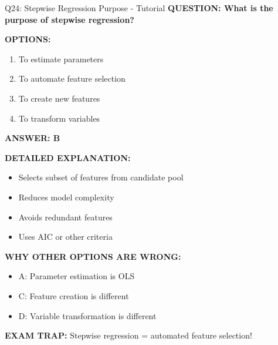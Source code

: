 \documentclass[8pt]{beamer}
\begin{document}
	\begin{frame}{Q24: Stepwise Regression Purpose - Tutorial}
		\fontsize{6.5}{7.5}\selectfont
		\textbf{QUESTION: What is the purpose of stepwise regression?}
		
		\vspace{0.1cm}
		\textbf{OPTIONS:}
		\begin{enumerate}
			\item To estimate parameters
			\item To automate feature selection
			\item To create new features
			\item To transform variables
		\end{enumerate}
		
		\vspace{0.1cm}
		\textcolor{myblue}{\textbf{ANSWER: B}}
		
		\vspace{0.1cm}
		\textbf{DETAILED EXPLANATION:}
		\begin{itemize}
			\item Selects subset of features from candidate pool
			\item Reduces model complexity
			\item Avoids redundant features
			\item Uses AIC or other criteria
		\end{itemize}
		
		\vspace{0.1cm}
		\textcolor{myred}{\textbf{WHY OTHER OPTIONS ARE WRONG:}}
		\begin{itemize}
			\item \textcolor{myred}{A:} Parameter estimation is OLS
			\item \textcolor{myred}{C:} Feature creation is different
			\item \textcolor{myred}{D:} Variable transformation is different
		\end{itemize}
		
		\textcolor{myred}{\textbf{EXAM TRAP:}} Stepwise regression = \textcolor{myblue}{automated feature selection}!
	\end{frame}
	
\end{document}
